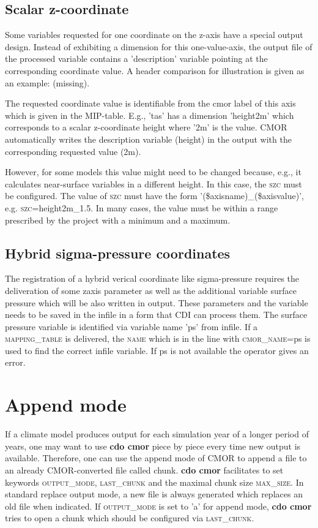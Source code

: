 \subsection{Scalar z-coordinate}

Some variables requested for one coordinate on the z-axis have a special output design. Instead of exhibiting a dimension for this one-value-axis, the output file of the processed variable contains a 'description' variable pointing at the corresponding coordinate value. A header comparison for illustration is given as an example: (missing).

The requested coordinate value is identifiable from the cmor label of this axis which is given in the MIP-table. E.g., 'tas' has a dimension 'height2m' which corresponds to a scalar z-coordinate height where '2m' is the value. CMOR automatically writes the description variable (height) in the output with the corresponding requested value (2m).

However, for some models this value might need to be changed because, e.g., it calculates near-surface variables in a different height. In this case, the \textsc{szc} must be configured. The value of \textsc{szc} must have the form '(\$axisname)\_(\$axisvalue)', e.g. \textsc{szc}=height2m\_1.5. In many cases, the value must be within a range prescribed by the project with a minimum and a maximum.

\subsection{Hybrid sigma-pressure coordinates}

The registration of a hybrid verical coordinate like sigma-pressure requires the deliveration of some zaxis parameter as well as the additional variable surface pressure which will be also written in output. These parameters and the variable needs to be saved in the infile in a form that CDI can process them. The surface pressure variable is identified via variable name 'ps' from infile. If a \textsc{mapping\_table} is delivered, the \textsc{name} which is in the line with \textsc{cmor\_name}=ps is used to find the correct infile variable. If ps is not available the operator gives an error.

\section{Append mode}

If a climate model produces output for each simulation year of a longer period of years, one may want to use \textbf{cdo cmor} piece by piece every time new output is available. Therefore, one can use the append mode of CMOR to append a file to an already CMOR-converted file called chunk. \textbf{cdo cmor} facilitates to set keywords \textsc{output\_mode}, \textsc{last\_chunk} and the maximal chunk size \textsc{max\_size}. In standard replace output mode, a new file is always generated which replaces an old file when indicated. If \textsc{output\_mode} is set to 'a' for append mode, \textbf{cdo cmor} tries to open a chunk which should be configured via \textsc{last\_chunk}.

